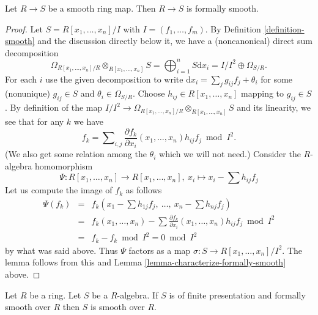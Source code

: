 \begin{lemma}
\label{lemma-smooth-formally-smooth}
Let $R \to S$ be a smooth ring map.
Then $R \to S$ is formally smooth.
\end{lemma}

\begin{proof}
Let $S = R[x_1, \ldots, x_n]/I$ with $I = (f_1, \ldots, f_m)$.
By Definition \ref{definition-smooth}
and the discussion directly below it, we have
a (noncanonical) direct sum decomposition
$$
\Omega_{R[x_1, \ldots, x_n]/R} \otimes_{R[x_1, \ldots, x_n]} S
= \bigoplus_{i = 1}^n S \text{d}x_i 
= I/I^2 \oplus \Omega_{S/R}.
$$
For each $i$ use the given decomposition to write
$\text{d}x_i = \sum_j g_{ij} f_j + \theta_i$ for some (nonunique)
$g_{ij} \in S$ and $\theta_i \in \Omega_{S/R}$.
Choose $h_{ij} \in R[x_1, \ldots, x_n]$ mapping to $g_{ij} \in S$.
By definition of the map
$I/I^2 \to \Omega_{R[x_1, \ldots, x_n]/R} \otimes_{R[x_1, \ldots, x_n]} S$
and its linearity, we see that for any $k$ we have
$$
f_k = 
\sum\nolimits_{i,j}
\frac{\partial f_k}{\partial x_i}(x_1, \ldots, x_n) h_{ij} f_j
\bmod I^2.
$$
(We also get some relation among the $\theta_i$ which we will
not need.)
Consider the $R$-algebra homomorphism
$$
\Psi :
R[x_1, \ldots, x_n] \to R[x_1, \ldots, x_n],\ 
x_i \mapsto x_i - \sum h_{ij} f_j
$$
Let us compute the image of $f_k$ as follows
\begin{eqnarray*}
\Psi(f_k) & = &
f_k(x_1 - \sum h_{1j} f_j,\ \ldots,\ x_n - \sum h_{nj} f_j) \\
& = &
f_k(x_1, \ldots, x_n) -
\sum \frac{\partial f_k}{\partial x_i}(x_1, \ldots, x_n) h_{ij} f_j
\bmod I^2 \\
& = & f_k - f_k \bmod I^2 = 0 \bmod I^2
\end{eqnarray*}
by what was said above. Thus $\Psi$ factors as a map
$\sigma : S \to R[x_1, \ldots, x_n]/I^2$. The lemma follows
from this and Lemma \ref{lemma-characterize-formally-smooth} above.
\end{proof}

\begin{lemma}
\label{lemma-formally-smooth-smooth}
Let $R$ be a ring. Let $S$ be a $R$-algebra.
If $S$ is of finite presentation and formally smooth over $R$
then $S$ is smooth over $R$.
\end{lemma}

